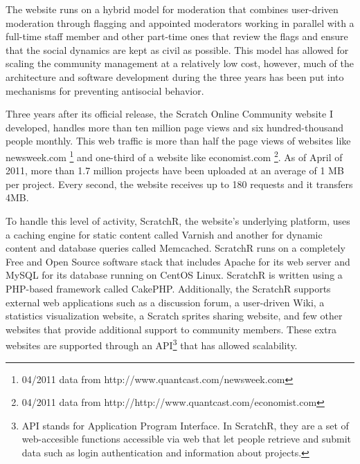 The website runs on a hybrid model for moderation that combines user-driven moderation through flagging and appointed moderators working in parallel with a full-time staff member and other part-time ones that review the flags and ensure that the social dynamics are kept as civil as possible. 
This model has allowed for scaling the community management at a relatively low cost, however, much of the architecture and software development during the three years has been put into mechanisms for preventing antisocial behavior.

Three years after its official release, the Scratch Online Community website I developed, handles more than ten million page views and six hundred-thousand people monthly.
This web traffic is more than half the page views of websites like newsweek.com \footnote{04/2011 data from http://www.quantcast.com/newsweek.com} and one-third of a website like economist.com \footnote{04/2011 data from http://http://www.quantcast.com/economist.com}.
As of April of 2011, more than 1.7 million projects have been uploaded at an average of 1 MB per project. 
Every second, the website receives up to 180 requests and it transfers 4MB.

To handle this level of activity, ScratchR, the website's underlying platform, uses a caching engine for static content called Varnish and another for dynamic content and database queries called Memcached. 
ScratchR runs on a completely Free and Open Source software stack that includes Apache for its web server and MySQL for its database running on CentOS Linux. 
ScratchR is written using a PHP-based framework called CakePHP.
Additionally, the ScratchR supports external  web applications such as a discussion forum, a user-driven Wiki, a statistics visualization website, a Scratch sprites sharing website, and few other websites that provide additional support to community members. 
These extra websites are supported through an API\footnote{API stands for Application Program Interface. In ScratchR, they are a set of web-accesible functions accessible via web that let people retrieve and submit data such as login authentication and information about projects.} that has allowed scalability.
